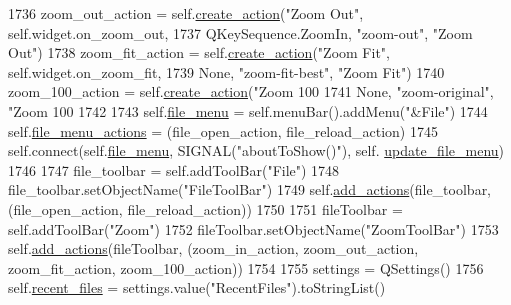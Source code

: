 \begin{DoxyCode}
1736         zoom\_out\_action = self.\hyperlink{classsmacc__viewer_1_1xdot_1_1xdot__qt_1_1DotWindow_ae443e00705b869417f630254683e5526}{create\_action}(\textcolor{stringliteral}{"Zoom Out"}, self.widget.on\_zoom\_out,
1737                 QKeySequence.ZoomIn, \textcolor{stringliteral}{"zoom-out"}, \textcolor{stringliteral}{"Zoom Out"})
1738         zoom\_fit\_action = self.\hyperlink{classsmacc__viewer_1_1xdot_1_1xdot__qt_1_1DotWindow_ae443e00705b869417f630254683e5526}{create\_action}(\textcolor{stringliteral}{"Zoom Fit"}, self.widget.on\_zoom\_fit,
1739                 \textcolor{keywordtype}{None}, \textcolor{stringliteral}{"zoom-fit-best"}, \textcolor{stringliteral}{"Zoom Fit"})
1740         zoom\_100\_action = self.\hyperlink{classsmacc__viewer_1_1xdot_1_1xdot__qt_1_1DotWindow_ae443e00705b869417f630254683e5526}{create\_action}(\textcolor{stringliteral}{"Zoom 100%
1741                 \textcolor{keywordtype}{None}, \textcolor{stringliteral}{"zoom-original"}, \textcolor{stringliteral}{"Zoom 100%
1742 
1743         self.\hyperlink{classsmacc__viewer_1_1xdot_1_1xdot__qt_1_1DotWindow_ad99f07df7efcd8ccbc6809e7536c8ad5}{file\_menu} = self.menuBar().addMenu(\textcolor{stringliteral}{"&File"})
1744         self.\hyperlink{classsmacc__viewer_1_1xdot_1_1xdot__qt_1_1DotWindow_a812d913b31f5ef7717e4b0687e8cde4b}{file\_menu\_actions} = (file\_open\_action, file\_reload\_action)
1745         self.connect(self.\hyperlink{classsmacc__viewer_1_1xdot_1_1xdot__qt_1_1DotWindow_ad99f07df7efcd8ccbc6809e7536c8ad5}{file\_menu}, SIGNAL(\textcolor{stringliteral}{"aboutToShow()"}), self.
      \hyperlink{classsmacc__viewer_1_1xdot_1_1xdot__qt_1_1DotWindow_a8b933eef6595908c1ac56b7b9d40cbfc}{update\_file\_menu})
1746 
1747         file\_toolbar = self.addToolBar(\textcolor{stringliteral}{"File"})
1748         file\_toolbar.setObjectName(\textcolor{stringliteral}{"FileToolBar"})
1749         self.\hyperlink{classsmacc__viewer_1_1xdot_1_1xdot__qt_1_1DotWindow_ac5e2f89ee361411b49a405c888ef4117}{add\_actions}(file\_toolbar, (file\_open\_action, file\_reload\_action))
1750 
1751         fileToolbar = self.addToolBar(\textcolor{stringliteral}{"Zoom"})
1752         fileToolbar.setObjectName(\textcolor{stringliteral}{"ZoomToolBar"})
1753         self.\hyperlink{classsmacc__viewer_1_1xdot_1_1xdot__qt_1_1DotWindow_ac5e2f89ee361411b49a405c888ef4117}{add\_actions}(fileToolbar, (zoom\_in\_action, zoom\_out\_action,  zoom\_fit\_action,  
      zoom\_100\_action))
1754 
1755         settings = QSettings()
1756         self.\hyperlink{classsmacc__viewer_1_1xdot_1_1xdot__qt_1_1DotWindow_a6eabf9d0596a910be7ecb943d65e7494}{recent\_files} = settings.value(\textcolor{stringliteral}{"RecentFiles"}).toStringList()
}}
\end{DoxyCode}
